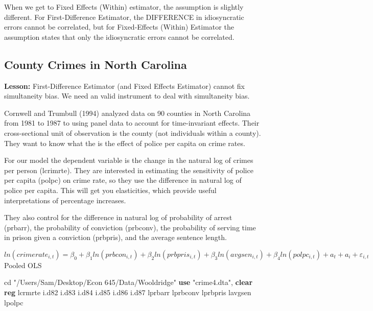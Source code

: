 \documentclass[
]{book}
\newenvironment{Shaded}{\begin{snugshade}}{\end{snugshade}}
\newcommand{\KeywordTok}[1]{\textcolor[rgb]{0.13,0.29,0.53}{\textbf{#1}}}
\newcommand{\NormalTok}[1]{#1}
\newcommand{\StringTok}[1]{\textcolor[rgb]{0.31,0.60,0.02}{#1}}
\begin{document}
When we get to Fixed Effects (Within) estimator, the assumption is slightly different. For First-Difference Estimator, the DIFFERENCE in idiosyncratic errors cannot be correlated, but for Fixed-Effects (Within) Estimator the assumption states that only the idiosyncratic errors cannot be correlated.

\subsection{County Crimes in North Carolina}\label{county-crimes-in-north-carolina}

\textbf{Lesson:} First-Difference Estimator (and Fixed Effects Estimator) cannot fix simultaneity bias. We need an valid instrument to deal with simultaneity bias.

Cornwell and Trumbull (1994) analyzed data on 90 counties in North Carolina from 1981 to 1987 to using panel data to account for time-invariant effects. Their cross-sectional unit of observation is the county (not individuals within a county). They want to know what the is the effect of police per capita on crime rates.

For our model the dependent variable is the change in the natural log of crimes per person (lcrimrte). They are interested in estimating the sensitivity of police per capita (polpc) on crime rate, so they use the difference in natural log of police per capita. This will get you elasticities, which provide useful interpretations of percentage increases.

They also control for the difference in natural log of probability of arrest (prbarr), the probability of conviction (prbconv), the probability of serving time in prison given a conviction (prbpris), and the average sentence length.

\[ ln(crimerate_{i,t}) = \beta_0 + \beta_1 ln(prbcon_{i,t}) + \beta_2 ln(prbpris_{i,t}) + \beta_3 ln(avgsen_{i,t}) + \beta_4 ln(polpc_{i,t}) + a_t + a_i + \varepsilon_{i,t} \]
Pooled OLS

\begin{Shaded}
\begin{Highlighting}[]
\NormalTok{cd }\StringTok{"/Users/Sam/Desktop/Econ 645/Data/Wooldridge"}
\KeywordTok{use} \StringTok{"crime4.dta"}\NormalTok{, }\KeywordTok{clear}
\KeywordTok{reg}\NormalTok{ lcrmrte i.d82 i.d83 i.d84 i.d85 i.d86 i.d87 lprbarr lprbconv lprbpris lavgsen lpolpc}
\end{Highlighting}
\end{Shaded}
\end{document}
